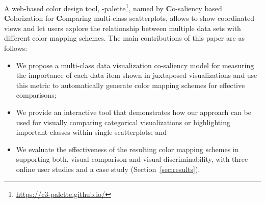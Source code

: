 A web-based color design tool, \toolname-palette\footnote{\small \url{https://c3-palette.github.io/}}, named by \textbf{C}o-saliency based \textbf{C}olorization for \textbf{C}omparing multi-class scatterplots, allows to show coordinated views and let users  explore the relationship between multiple data sets with different color mapping schemes.
The main contributions of this paper are as follows:
\begin{itemize}[noitemsep]
\setlength{\itemsep}{5pt}
  \item We propose a multi-class data visualization co-saliency model for measuring the importance of each data item shown in juxtaposed visualizations and use this metric to automatically generate color mapping schemes for effective comparisons;
    \item
  We provide an interactive tool that demonstrates how our approach can be used for visually comparing categorical visualizations or highlighting important classes within single scatterplots; and
  \item
   We evaluate the effectiveness of the resulting color mapping schemes in supporting both, visual comparison and visual discriminability, with three online user studies and a case study (Section~\ref{sec:results}).

\end{itemize}

